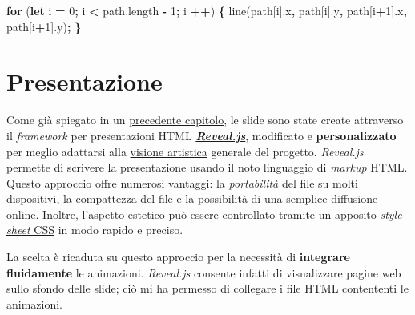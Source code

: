 \documentclass[
]{book}
\newenvironment{Shaded}{\begin{snugshade}}{\end{snugshade}}
\newcommand{\AttributeTok}[1]{\textcolor[rgb]{0.77,0.63,0.00}{#1}}
\newcommand{\ControlFlowTok}[1]{\textcolor[rgb]{0.13,0.29,0.53}{\textbf{#1}}}
\newcommand{\DecValTok}[1]{\textcolor[rgb]{0.00,0.00,0.81}{#1}}
\newcommand{\KeywordTok}[1]{\textcolor[rgb]{0.13,0.29,0.53}{\textbf{#1}}}
\newcommand{\NormalTok}[1]{#1}
\newcommand{\OperatorTok}[1]{\textcolor[rgb]{0.81,0.36,0.00}{\textbf{#1}}}
\newcommand{\VariableTok}[1]{\textcolor[rgb]{0.00,0.00,0.00}{#1}}
\begin{document}
\begin{Shaded}
\begin{Highlighting}[]
\ControlFlowTok{for}\NormalTok{ (}\KeywordTok{let}\NormalTok{ i }\OperatorTok{=} \DecValTok{0}\OperatorTok{;}\NormalTok{ i }\OperatorTok{<} \VariableTok{path}\NormalTok{.}\AttributeTok{length} \OperatorTok{-} \DecValTok{1}\OperatorTok{;}\NormalTok{ i }\OperatorTok{++}\NormalTok{) }\OperatorTok{\{}
  \AttributeTok{line}\NormalTok{(path[i].}\AttributeTok{x}\OperatorTok{,}\NormalTok{ path[i].}\AttributeTok{y}\OperatorTok{,}\NormalTok{ path[i}\OperatorTok{+}\DecValTok{1}\NormalTok{].}\AttributeTok{x}\OperatorTok{,}\NormalTok{ path[i}\OperatorTok{+}\DecValTok{1}\NormalTok{].}\AttributeTok{y}\NormalTok{)}\OperatorTok{;}
\OperatorTok{\}}
\end{Highlighting}
\end{Shaded}

\hypertarget{pressoft}{%
\section{Presentazione}\label{pressoft}}

Come già spiegato in un \protect\hyperlink{presentzione}{precedente capitolo}, le slide sono state create attraverso il \emph{framework} per presentazioni HTML \href{https://revealjs.com/}{\emph{\textbf{Reveal.js}}}, modificato e \textbf{personalizzato} per meglio adattarsi alla \protect\hyperlink{filosofia}{visione artistica} generale del progetto. \emph{Reveal.js} permette di scrivere la presentazione usando il noto linguaggio di \emph{markup} HTML. Questo approccio offre numerosi vantaggi: la \emph{portabilità} del file su molti dispositivi, la compattezza del file e la possibilità di una semplice diffusione online.
Inoltre, l'aspetto estetico può essere controllato tramite un \href{}{apposito \emph{style sheet} CSS} in modo rapido e preciso.

La scelta è ricaduta su questo approccio per la necessità di \textbf{integrare fluidamente} le animazioni. \emph{Reveal.js} consente infatti di visualizzare pagine web sullo sfondo delle slide; ciò mi ha permesso di collegare i file HTML contententi le animazioni.
\end{document}
